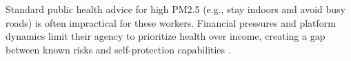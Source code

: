 Standard public health advice for high PM2.5 (e.g., stay indoors and avoid busy roads) \cite{cdc_pm25} is often impractical for these workers.
Financial pressures and platform dynamics limit their agency to prioritize health over income, creating a gap between known risks and self-protection capabilities \cite{tieanklin2024rideshare}.




